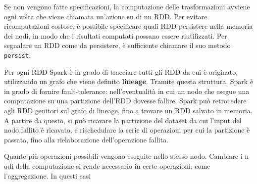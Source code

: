 \documentclass[italian,a4paper, twoside, 12pt]{report}
\begin{document}
Se non vengono fatte specificazioni, la computazione delle
trasformazioni avviene ogni volta che viene chiamata un'azione su di un
RDD. Per evitare ricomputazioni costose, è possibile specificare quali
RDD persistere nella memoria dei nodi, in modo che i risultati computati
possano essere riutilizzati. Per segnalare un RDD come da persistere, è
sufficiente chiamare il suo metodo \lstinline!persist!.

Per ogni RDD Spark è in grado di tracciare tutti gli RDD da cui è
originato, utilizzando un grafo che viene definito \textbf{lineage}.
Tramite questa struttura, Spark è in grado di fornire fault-tolerance:
nell'eventualità in cui un nodo che esegue una computazione su una
partizione dell'RDD dovesse fallire, Spark può retrocedere agli RDD
genitori sul grafo di lineage, fino a trovare un RDD salvato in memoria.
A partire da questo, si può ricavare la partizione del dataset da cui
l'input del nodo fallito è ricavato, e rischedulare la serie di
operazioni per cui la partizione è passata, fino alla rielaborazione
dell'operazione fallita.

Quante più operazioni possibili vengono eseguite nello stesso nodo.
Cambiare i n odi della computazione si rende necessario in certe
operazioni, come l'aggregazione. In questi casi
\end{document}
